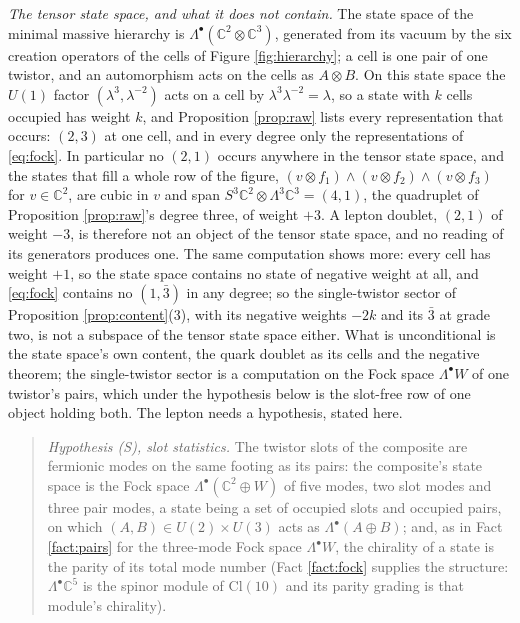 \documentclass[11pt]{article}
\theoremstyle{definition}
\newcommand{\Cl}{\mathrm{Cl}}
\newcommand{\C}{\mathbb{C}}
\begin{document}
\emph{The tensor state space, and what it does not contain.} The state space of the minimal massive hierarchy is $\Lambda^{\bullet}(\C^{2} \otimes \C^{3})$, generated from its vacuum by the six creation operators of the cells of Figure \ref{fig:hierarchy}; a cell is one pair of one twistor, and an automorphism acts on the cells as $A \otimes B$. On this state space the $U(1)$ factor $(\lambda^{3}, \lambda^{-2})$ acts on a cell by $\lambda^{3}\lambda^{-2} = \lambda$, so a state with $k$ cells occupied has weight $k$, and Proposition \ref{prop:raw} lists every representation that occurs: $(2,3)$ at one cell, and in every degree only the representations of \eqref{eq:fock}. In particular no $(2,1)$ occurs anywhere in the tensor state space, and the states that fill a whole row of the figure, $(v \otimes f_{1}) \wedge (v \otimes f_{2}) \wedge (v \otimes f_{3})$ for $v \in \C^{2}$, are cubic in $v$ and span $S^{3}\C^{2} \otimes \Lambda^{3}\C^{3} = (4, 1)$, the quadruplet of Proposition \ref{prop:raw}'s degree three, of weight $+3$. A lepton doublet, $(2,1)$ of weight $-3$, is therefore not an object of the tensor state space, and no reading of its generators produces one. The same computation shows more: every cell has weight $+1$, so the state space contains no state of negative weight at all, and \eqref{eq:fock} contains no $(1, \bar{3})$ in any degree; so the single-twistor sector of Proposition \ref{prop:content}(3), with its negative weights $-2k$ and its $\bar{3}$ at grade two, is not a subspace of the tensor state space either. What is unconditional is the state space's own content, the quark doublet as its cells and the negative theorem; the single-twistor sector is a computation on the Fock space $\Lambda^{\bullet}W$ of one twistor's pairs, which under the hypothesis below is the slot-free row of one object holding both. The lepton needs a hypothesis, stated here.

\begin{quote}
\emph{Hypothesis (S), slot statistics.} The twistor slots of the composite are fermionic modes on the same footing as its pairs: the composite's state space is the Fock space $\Lambda^{\bullet}(\C^{2} \oplus W)$ of five modes, two slot modes and three pair modes, a state being a set of occupied slots and occupied pairs, on which $(A, B) \in U(2) \times U(3)$ acts as $\Lambda^{\bullet}(A \oplus B)$; and, as in Fact \ref{fact:pairs} for the three-mode Fock space $\Lambda^{\bullet}W$, the chirality of a state is the parity of its total mode number (Fact \ref{fact:fock} supplies the structure: $\Lambda^{\bullet}\C^{5}$ is the spinor module of $\Cl(10)$ and its parity grading is that module's chirality).
\end{quote}
\end{document}
